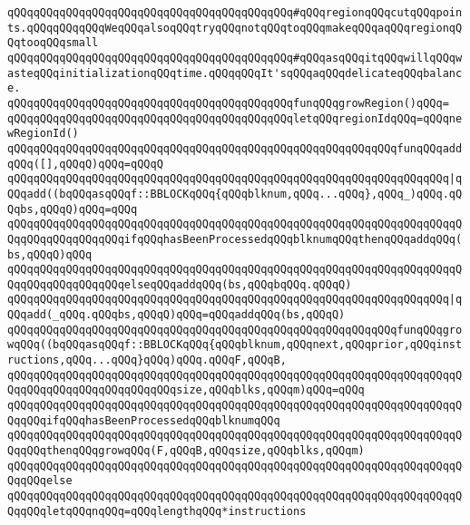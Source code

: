 \verb|qQQqqQQqqQQqqQQqqQQqqQQqqQQqqQQqqQQqqQQqqQQq#qQQqregionqQQqcutqQQqpoints.qQQqqQQqqQQqWeqQQqalsoqQQqtryqQQqnotqQQqtoqQQqmakeqQQqaqQQqregionqQQqtooqQQqsmall|\newline
\verb|qQQqqQQqqQQqqQQqqQQqqQQqqQQqqQQqqQQqqQQqqQQq#qQQqasqQQqitqQQqwillqQQqwasteqQQqinitializationqQQqtime.qQQqqQQqIt'sqQQqaqQQqdelicateqQQqbalance.|\newline
\newline
\verb|qQQqqQQqqQQqqQQqqQQqqQQqqQQqqQQqqQQqqQQqqQQqfunqQQqgrowRegion()qQQq=|\newline
\verb|qQQqqQQqqQQqqQQqqQQqqQQqqQQqqQQqqQQqqQQqqQQqletqQQqregionIdqQQq=qQQqnewRegionId()|\newline
\verb|qQQqqQQqqQQqqQQqqQQqqQQqqQQqqQQqqQQqqQQqqQQqqQQqqQQqqQQqqQQqfunqQQqaddqQQq([],qQQqQ)qQQq=qQQqQ|\newline
\verb|qQQqqQQqqQQqqQQqqQQqqQQqqQQqqQQqqQQqqQQqqQQqqQQqqQQqqQQqqQQqqQQqqQQq|\verb#|qQQqadd((bqQQqasqQQqf::BBLOCKqQQq{qQQqblknum,qQQq...qQQq},qQQq_)qQQq.qQQqbs,qQQqQ)qQQq=qQQq#\newline
\verb|qQQqqQQqqQQqqQQqqQQqqQQqqQQqqQQqqQQqqQQqqQQqqQQqqQQqqQQqqQQqqQQqqQQqqQQqqQQqqQQqqQQqqQQqifqQQqhasBeenProcessedqQQqblknumqQQqthenqQQqaddqQQq(bs,qQQqQ)qQQq|\newline
\verb|qQQqqQQqqQQqqQQqqQQqqQQqqQQqqQQqqQQqqQQqqQQqqQQqqQQqqQQqqQQqqQQqqQQqqQQqqQQqqQQqqQQqqQQqelseqQQqaddqQQq(bs,qQQqbqQQq.qQQqQ)|\newline
\verb|qQQqqQQqqQQqqQQqqQQqqQQqqQQqqQQqqQQqqQQqqQQqqQQqqQQqqQQqqQQqqQQqqQQq|\verb#|qQQqadd(_qQQq.qQQqbs,qQQqQ)qQQq=qQQqaddqQQq(bs,qQQqQ)#\newline
\verb|qQQqqQQqqQQqqQQqqQQqqQQqqQQqqQQqqQQqqQQqqQQqqQQqqQQqqQQqqQQqfunqQQqgrowqQQq((bqQQqasqQQqf::BBLOCKqQQq{qQQqblknum,qQQqnext,qQQqprior,qQQqinstructions,qQQq...qQQq}qQQq)qQQq.qQQqF,qQQqB,|\newline
\verb|qQQqqQQqqQQqqQQqqQQqqQQqqQQqqQQqqQQqqQQqqQQqqQQqqQQqqQQqqQQqqQQqqQQqqQQqqQQqqQQqqQQqqQQqqQQqqQQqsize,qQQqblks,qQQqm)qQQq=qQQq|\newline
\verb|qQQqqQQqqQQqqQQqqQQqqQQqqQQqqQQqqQQqqQQqqQQqqQQqqQQqqQQqqQQqqQQqqQQqqQQqqQQqifqQQqhasBeenProcessedqQQqblknumqQQq|\newline
\verb|qQQqqQQqqQQqqQQqqQQqqQQqqQQqqQQqqQQqqQQqqQQqqQQqqQQqqQQqqQQqqQQqqQQqqQQqqQQqthenqQQqgrowqQQq(F,qQQqB,qQQqsize,qQQqblks,qQQqm)|\newline
\verb|qQQqqQQqqQQqqQQqqQQqqQQqqQQqqQQqqQQqqQQqqQQqqQQqqQQqqQQqqQQqqQQqqQQqqQQqqQQqelse|\newline
\verb|qQQqqQQqqQQqqQQqqQQqqQQqqQQqqQQqqQQqqQQqqQQqqQQqqQQqqQQqqQQqqQQqqQQqqQQqqQQqletqQQqnqQQq=qQQqlengthqQQq*instructions|\newline
